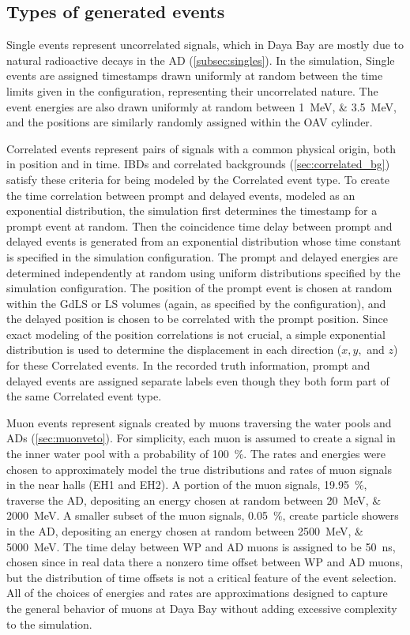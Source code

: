\subsection{Types of generated events}

Single events represent uncorrelated signals,
which in Daya Bay are mostly due to natural radioactive decays in the AD
(\cref{subsec:singles}).
In the simulation, Single events are assigned timestamps
drawn uniformly at random between the time limits given in the configuration,
representing their uncorrelated nature.
The event energies are also drawn uniformly at random
between \SIlist{1;3.5}{\MeV},
and the positions are similarly randomly assigned
within the OAV cylinder.

Correlated events represent pairs of signals
with a common physical origin, both in position and in time.
IBDs and correlated backgrounds (\cref{sec:correlated_bg})
satisfy these criteria for being modeled by the Correlated event type.
To create the time correlation between prompt and delayed events,
modeled as an exponential distribution,
the simulation first determines the timestamp for a prompt event at random.
Then the coincidence time delay between prompt and delayed events is generated
from an exponential distribution
whose time constant is specified in the simulation configuration.
The prompt and delayed energies are determined independently at random
using uniform distributions specified by the simulation configuration.
The position of the prompt event is chosen at random
within the GdLS or LS volumes (again, as specified by the configuration),
and the delayed position is chosen to be correlated with the prompt position.
Since exact modeling of the position correlations is not crucial,
a simple exponential distribution is used to determine the displacement
in each direction ($x,y,$ and $z$) for these Correlated events.
In the recorded truth information,
prompt and delayed events are assigned separate labels
even though they both form part of the same Correlated event type.

Muon events represent signals created by muons traversing
the water pools and ADs (\cref{sec:muonveto}).
For simplicity, each muon is assumed to create a signal
in the inner water pool with a probability of \SI{100}{\percent}.
The rates and energies were chosen to approximately model
the true distributions and rates of muon signals in the near halls (EH1 and EH2).
A portion of the muon signals, \SI{19.95}{\percent},
traverse the AD, depositing an energy chosen at random between
\SIlist{20;2000}{\MeV}.
A smaller subset of the muon signals, \SI{0.05}{\percent},
create particle showers in the AD, depositing an energy chosen at random between
\SIlist{2500;5000}{\MeV}.
The time delay between WP and AD muons is assigned to be \SI{50}{\ns},
chosen since in real data there a nonzero time offset between WP and AD muons,
but the distribution of time offsets
is not a critical feature of the event selection.
All of the choices of energies and rates are approximations
designed to capture the general behavior of muons at Daya Bay
without adding excessive complexity to the simulation.

